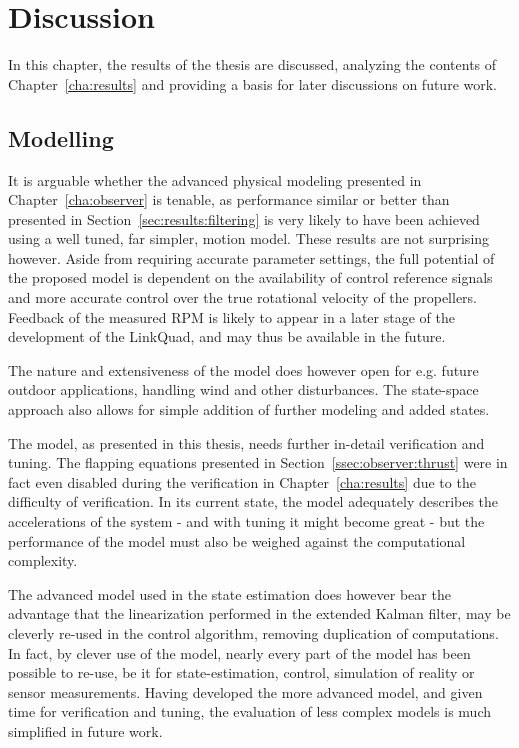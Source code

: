 \chapter{Discussion}
\label{cha:discussion}
    In this chapter, the results of the thesis are discussed,
    analyzing the contents of Chapter~\ref{cha:results} and providing
    a basis for later discussions on future work.

    \section{Modelling}
        It is arguable whether the advanced physical modeling presented
        in Chapter~\ref{cha:observer} is tenable, as performance similar or better
        than presented in Section~\ref{sec:results:filtering} is very likely
        to have been achieved using a well tuned, far simpler, motion model.
        These results are not surprising however.
        Aside from requiring accurate parameter settings, the full potential of the
        proposed model is dependent on the availability of control reference
        signals and more accurate control over the true rotational velocity of
        the propellers. Feedback of the measured RPM is likely to appear in
        a later stage of the development of the LinkQuad, and may thus
        be available in the future.

        The nature and extensiveness of the model does however open
        for e.g. future outdoor applications, handling wind and other
        disturbances. The state-space approach also allows for simple addition
        of further modeling and added states.

        The model, as presented in this thesis, needs further in-detail
        verification and tuning. The flapping equations presented in
        Section~\ref{ssec:observer:thrust} were in fact even disabled during
        the verification in Chapter~\ref{cha:results} due to the
        difficulty of verification. In its current state, the model
        adequately describes the accelerations of the system - and with tuning it might become great -
        but the performance of the model must also be weighed against
        the computational complexity.

        The advanced model used in the state estimation does however bear the
        advantage that the linearization performed in the extended Kalman filter,
        may be cleverly re-used in the control algorithm, removing duplication
        of computations. In fact, by clever use of the model,
        nearly every part of the model has been possible to re-use, be it for
        state-estimation, control, simulation of reality or sensor measurements.
        Having developed the more advanced model, and given time for
        verification and tuning, the evaluation of less complex models is much
        simplified in future work.


